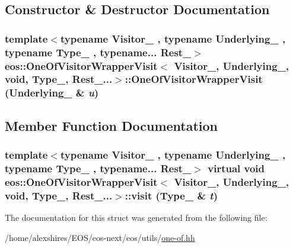 \subsection{Constructor \& Destructor Documentation}
\hypertarget{structeos_1_1OneOfVisitorWrapperVisit_3_01Visitor___00_01Underlying___00_01void_00_01Type___00_01Rest___8_8_8_4_a66d5952ec668457948e8ff1a657236fc}{
\subsubsection[{OneOfVisitorWrapperVisit}]{\setlength{\rightskip}{0pt plus 5cm}template$<$typename Visitor\_\- , typename Underlying\_\- , typename Type\_\- , typename... Rest\_\-$>$ eos::OneOfVisitorWrapperVisit$<$ Visitor\_\-, Underlying\_\-, void, Type\_\-, Rest\_\-...$>$::OneOfVisitorWrapperVisit (Underlying\_\- \& {\em u})}}
\label{structeos_1_1OneOfVisitorWrapperVisit_3_01Visitor___00_01Underlying___00_01void_00_01Type___00_01Rest___8_8_8_4_a66d5952ec668457948e8ff1a657236fc}


\subsection{Member Function Documentation}
\hypertarget{structeos_1_1OneOfVisitorWrapperVisit_3_01Visitor___00_01Underlying___00_01void_00_01Type___00_01Rest___8_8_8_4_a74791907b67583a00b9a3e373e3fa132}{
\subsubsection[{visit}]{\setlength{\rightskip}{0pt plus 5cm}template$<$typename Visitor\_\- , typename Underlying\_\- , typename Type\_\- , typename... Rest\_\-$>$ virtual void eos::OneOfVisitorWrapperVisit$<$ Visitor\_\-, Underlying\_\-, void, Type\_\-, Rest\_\-...$>$::visit (Type\_\- \& {\em t})}}
\label{structeos_1_1OneOfVisitorWrapperVisit_3_01Visitor___00_01Underlying___00_01void_00_01Type___00_01Rest___8_8_8_4_a74791907b67583a00b9a3e373e3fa132}


The documentation for this struct was generated from the following file:\begin{DoxyCompactItemize}
\item 
/home/alexshires/EOS/eos-\/next/eos/utils/\hyperlink{one-of_8hh}{one-\/of.hh}\end{DoxyCompactItemize}
